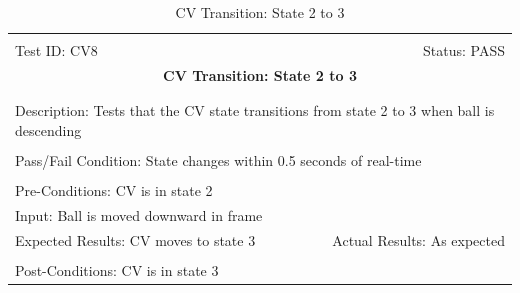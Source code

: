 \documentclass[11pt]{article}
\begin{document}
\begin{center}
\begin{table}[H]
\begin{tabular}{|l r|}\hline&\\[-2mm]
	Test ID: CV8	&Status: PASS\\[-3mm]
	\multicolumn{2}{|c|}{\textbf{\large{CV Transition: State 2 to 3}}}\\&\\\hline&\\[-3mm]
	\multicolumn{2}{|p{\textwidth}|}{Description: Tests that the CV state transitions from state 2 to 3 when ball is descending}\\[1mm]\hline&\\[-3mm]
	\multicolumn{2}{|p{\textwidth}|}{Pass/Fail Condition: State changes within 0.5 seconds of real-time}\\[1mm]\hline&\\[-3mm]
	\multicolumn{2}{|p{\textwidth}|}{Pre-Conditions: CV is in state 2}\\[4mm]
	\multicolumn{2}{|p{\textwidth}|}{Input: Ball is moved downward in frame}\\[2mm]\hline
	\multicolumn{1}{|p{0.49\textwidth}}{Expected Results: CV moves to state 3}	&\multicolumn{1}{|p{0.45\textwidth}|}{Actual Results: As expected}\\\hline&\\[-3mm]
	\multicolumn{2}{|p{\textwidth}|}{Post-Conditions: CV is in state 3}\\\hline
\end{tabular}
\caption{CV Transition: State 2 to 3}
\end{table}
\end{center}
\end{document}
